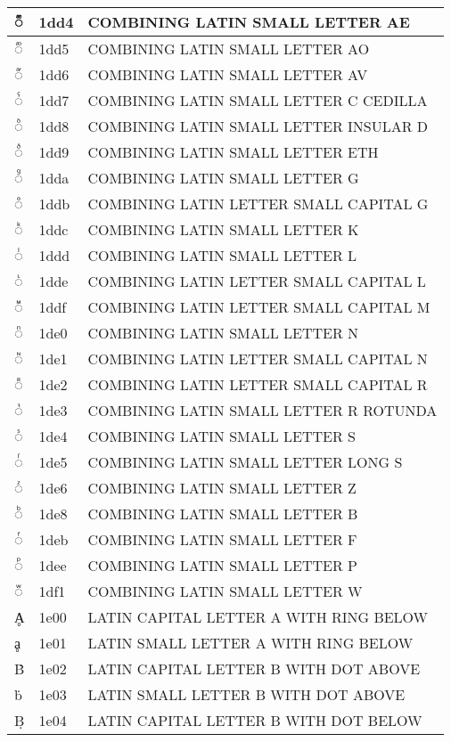 \documentclass[12pt,letterpaper,openany]{book}
\begin{document}
\begin{center}
\begin{supertabular}{|m{0.25in}|m{0.5in}|m{4in}|}
◌ᷔ & 1dd4 & COMBINING LATIN SMALL LETTER AE\\\hline
◌ᷕ & 1dd5 & COMBINING LATIN SMALL LETTER AO\\\hline
◌ᷖ & 1dd6 & COMBINING LATIN SMALL LETTER AV\\\hline
◌ᷗ & 1dd7 & COMBINING LATIN SMALL LETTER C CEDILLA\\\hline
◌ᷘ & 1dd8 & COMBINING LATIN SMALL LETTER INSULAR D\\\hline
◌ᷙ & 1dd9 & COMBINING LATIN SMALL LETTER ETH\\\hline
◌ᷚ & 1dda & COMBINING LATIN SMALL LETTER G\\\hline
◌ᷛ & 1ddb & COMBINING LATIN LETTER SMALL CAPITAL G\\\hline
◌ᷜ & 1ddc & COMBINING LATIN SMALL LETTER K\\\hline
◌ᷝ & 1ddd & COMBINING LATIN SMALL LETTER L\\\hline
◌ᷞ & 1dde & COMBINING LATIN LETTER SMALL CAPITAL L\\\hline
◌ᷟ & 1ddf & COMBINING LATIN LETTER SMALL CAPITAL M\\\hline
◌ᷠ & 1de0 & COMBINING LATIN SMALL LETTER N\\\hline
◌ᷡ & 1de1 & COMBINING LATIN LETTER SMALL CAPITAL N\\\hline
◌ᷢ & 1de2 & COMBINING LATIN LETTER SMALL CAPITAL R\\\hline
◌ᷣ & 1de3 & COMBINING LATIN SMALL LETTER R ROTUNDA\\\hline
◌ᷤ & 1de4 & COMBINING LATIN SMALL LETTER S\\\hline
◌ᷥ & 1de5 & COMBINING LATIN SMALL LETTER LONG S\\\hline
◌ᷦ & 1de6 & COMBINING LATIN SMALL LETTER Z\\\hline
◌ᷨ & 1de8 & COMBINING LATIN SMALL LETTER B\\\hline
◌ᷫ & 1deb & COMBINING LATIN SMALL LETTER F\\\hline
◌ᷮ & 1dee & COMBINING LATIN SMALL LETTER P\\\hline
◌ᷱ & 1df1 & COMBINING LATIN SMALL LETTER W\\\hline
Ḁ & 1e00 & LATIN CAPITAL LETTER A WITH RING BELOW\\\hline
ḁ & 1e01 & LATIN SMALL LETTER A WITH RING BELOW\\\hline
Ḃ & 1e02 & LATIN CAPITAL LETTER B WITH DOT ABOVE\\\hline
ḃ & 1e03 & LATIN SMALL LETTER B WITH DOT ABOVE\\\hline
Ḅ & 1e04 & LATIN CAPITAL LETTER B WITH DOT BELOW\\\hline

\end{supertabular}
\end{center}
\end{document}
